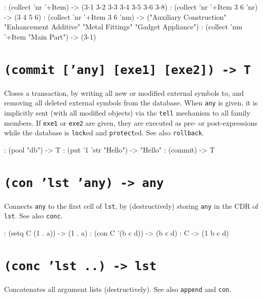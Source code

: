 \begin{wideverbatim}
: (collect 'nr '+Item)
-> ({3-1} {3-2} {3-3} {3-4} {3-5} {3-6} {3-8})
: (collect 'nr '+Item 3 6 'nr)
-> (3 4 5 6)
: (collect 'nr '+Item 3 6 'nm)
-> ("Auxiliary Construction" "Enhancement Additive"
    "Metal Fittings" "Gadget Appliance")
: (collect 'nm '+Item "Main Part")
-> ({3-1})
\end{wideverbatim}

 
\section*{\texttt{(commit ['any] [exe1] [exe2]) -> T}}
\label{sec:funct-rec-C-(commit-['any]-[exe1]-[exe2])-->-t}


Closes a transaction, by writing all new or modified external symbols
to, and removing all deleted external symbols from the database. When
\texttt{any} is given, it is implicitly sent (with all modified objects) via
the \texttt{tell} mechanism to all family members. If \texttt{exe1} or \texttt{exe2} are
given, they are executed as pre- or post-expressions while the database
is \texttt{lock}ed and \texttt{protect}ed. See also \texttt{rollback}.


\begin{wideverbatim}
: (pool "db")
-> T
: (put '{1} 'str "Hello")
-> "Hello"
: (commit)
-> T
\end{wideverbatim}

 
\section*{\texttt{(con 'lst 'any) -> any}}
\label{sec:funct-rec-C-(con-'lst-'any)-->-any}


Connects \texttt{any} to the first cell of \texttt{lst}, by (destructively) storing
\texttt{any} in the CDR of \texttt{lst}. See also \texttt{conc}.


\begin{wideverbatim}
: (setq C (1 . a))
-> (1 . a)
: (con C '(b c d))
-> (b c d)
: C
-> (1 b c d)
\end{wideverbatim}

 
\section*{\texttt{(conc 'lst ..) -> lst}}
\label{sec:funct-rec-C-(conc-'lst-..)-->-lst}


Concatenates all argument lists (destructively). See also \texttt{append} and
\texttt{con}.


